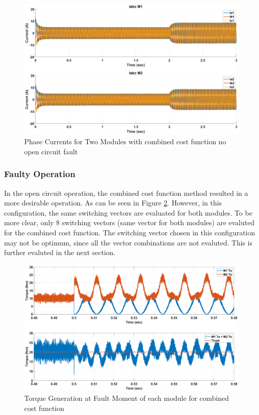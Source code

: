 \documentclass{article}
\begin{document}
\begin{figure}[H]
\centering
\includegraphics[scale=0.3]{Figures/TwoModule/CombinedCost/Ia_Ib_Ic.eps}
\caption{Phase Currents for Two Modules with combined cost function no open circuit fault}
\label{fig:Current_abc_TwoModuleCombinedCost}
\end{figure}

\subsubsection{Faulty Operation}
In the open circuit operation, the combined cost function method resulted in a more desirable operation. As can be seen in Figure \ref{fig:FaultMomentCombinedCost}. However, in this configuration, the same switching vectors are evaluated for both modules. To be more clear, only 8 switching vectors (same vector for both modules) are evaluted for the combined cost function. The switching vector chosen in this configuration may not be optimum, since all the vector combinations are not evaluted. This is further evaluted in the next section.

\begin{figure}[H]
\centering
\includegraphics[scale=0.3]{Figures/TwoModule/CombinedCost/FaultMoment.eps}
\caption{Torque Generation at Fault Moment of each module for combined cost function}
\label{fig:FaultMomentCombinedCost}
\end{figure}
\end{document}
